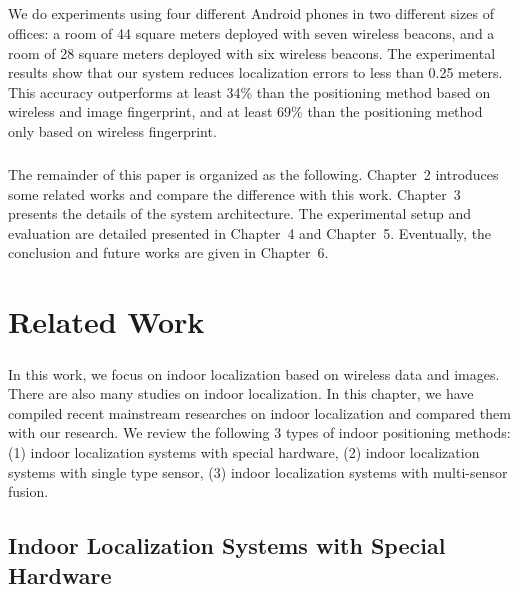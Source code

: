 \documentclass[a4paper,12pt]{report}
\begin{document}
\paragraph{}
We do experiments using four different Android phones in two different sizes of offices: a room of 44 square meters deployed with seven wireless beacons, and a room of 28 square meters deployed with six wireless beacons. The experimental results show that our system reduces localization errors to less than 0.25 meters. This accuracy outperforms at least 34\% than the positioning method based on wireless and image fingerprint, and at least 69\% than the positioning method only based on wireless fingerprint.
%

\paragraph{}
The remainder of this paper is organized as the following. Chapter~2 introduces some related works and compare the difference with this work. Chapter~3 presents the details of the system architecture. The experimental setup and evaluation are detailed presented in Chapter~4 and Chapter~5. Eventually, the conclusion and future works are given in Chapter~6.
%

\chapter{Related Work}

\paragraph{}
In this work, we focus on indoor localization based on wireless data and images. There are also many studies on indoor localization. In this chapter, we have compiled recent mainstream researches on indoor localization and compared them with our research. We review the following 3 types of indoor positioning methods: (1) indoor localization systems with special hardware, (2) indoor localization systems with single type sensor, (3) indoor localization systems with multi-sensor fusion.
%

\section{Indoor Localization Systems with Special Hardware}
\end{document}
